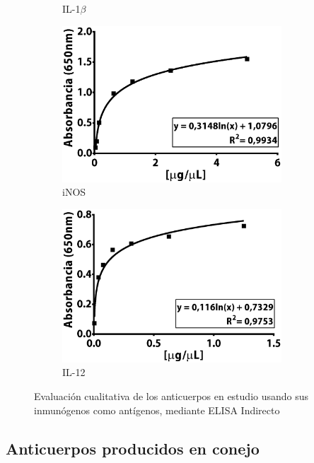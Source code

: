 \documentclass[12pt,letterpaper,oneside]{scrbook}
\begin{document}
\begin{figure}[h!]
\begin{subfigure}{0.5\textwidth}
        \caption{IL-1$\beta$}
        \label{fig:pep:il1b}
    \end{subfigure}
     \begin{subfigure}{0.5\textwidth}
        \includegraphics[width=0.9\textwidth]{peptidos/inos}
        \caption{iNOS}
        \label{fig:pep:inos}
    \end{subfigure}
    \begin{subfigure}{0.5\textwidth}
        \includegraphics[width=0.9\textwidth]{peptidos/il12}
        \caption{IL-12}
        \label{fig:pep:il12}
    \end{subfigure}
    \caption{Evaluación cualitativa de los anticuerpos en estudio usando sus inmunógenos como antígenos, mediante ELISA Indirecto}
    \label{fig:pep}
\end{figure}

\subsection{Anticuerpos producidos en conejo}
\end{document}
